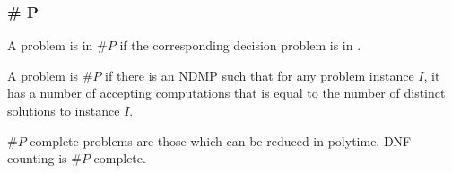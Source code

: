 \subsubsection{\# P}

A problem is in $\# P$ if the corresponding decision problem is in \nptime.

A problem is $\# P$ if there is an NDMP such that for any problem instance $I$,
it has a number of accepting computations that is equal to the number of distinct solutions
to instance $I$.

$\# P$-complete problems are those which can be reduced in polytime. DNF
counting is $\# P$ complete.
